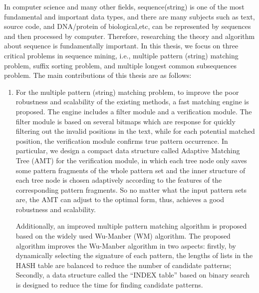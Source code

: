 \begin{englishabstract}

  In computer science and many other fields, sequence(string) is one
  of the most fundamental and important data types, and there are many
  subjects such as text, source code, and DNA/protein of
  biological,etc, can be represented by sequences and then processed
  by computer. Therefore, researching the theory and algorithm about
  sequence is fundamentally important. In this thesis, we focus on
  three critical problems in sequence mining, i.e., multiple pattern
  (string) matching problem, suffix sorting problem, and multiple
  longest common subsequences problem. The main contributions of this
  thesis are as follows:
  
  \begin{enumerate}
  \item For the multiple pattern (string) matching problem, to improve
    the poor robustness and scalability of the existing methods, a
    fast matching engine is proposed. The engine includes a filter
    module and a verification module. The filter module is based on
    several bitmaps which are response for quickly filtering out the
    invalid positions in the text, while for each potential matched
    position, the verification module confirms true pattern
    occurrence. In particular, we design a compact data structure
    called Adaptive Matching Tree (AMT) for the verification module,
    in which each tree node only saves some pattern fragments of the
    whole pattern set and the inner structure of each tree node is
    chosen adaptively according to the features of the corresponding
    pattern fragments. So no matter what the input pattern sets are,
    the AMT can adjust to the optimal form, thus, achieves a good
    robustness and scalability.

    Additionally, an improved multiple pattern matching algorithm is
    proposed based on the widely used Wu-Manber (WM) algorithm. The
    proposed algorithm improves the Wu-Manber algorithm in two
    aspects: firstly, by dynamically selecting the signature of each
    pattern, the lengths of lists in the HASH table are balanced to
    reduce the number of candidate patterns; Secondly, a data
    structure called the “INDEX table” based on binary search is
    designed to reduce the time for finding candidate patterns.
    

\end{enumerate}
\end{englishabstract}
